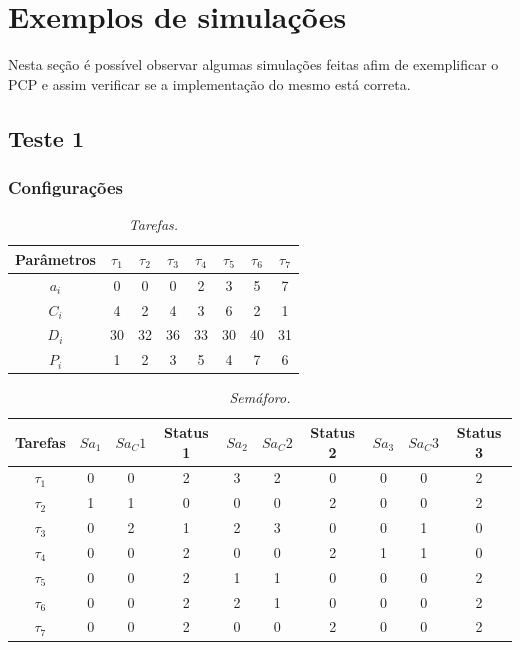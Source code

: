 \section{Exemplos de simulações}

Nesta seção é possível observar algumas simulações feitas afim de exemplificar o PCP e assim verificar se a implementação do mesmo está correta.

\subsection{Teste 1}
\subsubsection{Configurações}
\begin{table}[H]
\centering
\caption{\em Tarefas.}
\vspace{0.1cm}
\begin{tabular}{c||c|c|c|c|c|c|c}
 
Parâmetros & $\tau_1$ & $\tau_2$ & $\tau_3$ & $\tau_4$ & $\tau_5$ & $\tau_6$ & $\tau_7$\\ 
\hline 
                          
$a_i$ & 0 & 0 & 0 & 2 & 3 & 5 & 7\\ 
$C_i$ & 4 & 2 & 4 & 3 & 6 & 2 & 1\\ 
$D_i$ & 30 & 32 & 36 & 33 & 30 & 40 & 31\\
$P_i$ & 1 & 2 & 3 & 5 & 4 & 7 & 6
 
\end{tabular}
\end{table}

\begin{table}[H]
\centering
\caption{\em Semáforo.}
\vspace{0.1cm}
\begin{tabular}{c||c|c|c||c|c|c||c|c|c}
 
Tarefas & $Sa_1$ & $Sa_C1$ & Status 1 & $Sa_2$ & $Sa_C2$ & Status 2 & $Sa_3$ & $Sa_C3$ & Status 3\\ 
\hline 
                          
$\tau_1$ & 0 & 0 & 2 & 3 & 2 & 0 & 0 & 0 & 2\\ 
$\tau_2$ & 1 & 1 & 0 & 0 & 0 & 2 & 0 & 0 & 2\\
$\tau_3$ & 0 & 2 & 1 & 2 & 3 & 0 & 0 & 1 & 0\\
$\tau_4$ & 0 & 0 & 2 & 0 & 0 & 2 & 1 & 1 & 0\\
$\tau_5$ & 0 & 0 & 2 & 1 & 1 & 0 & 0 & 0 & 2\\
$\tau_6$ & 0 & 0 & 2 & 2 & 1 & 0 & 0 & 0 & 2\\
$\tau_7$ & 0 & 0 & 2 & 0 & 0 & 2 & 0 & 0 & 2
 
\end{tabular}
\end{table}

